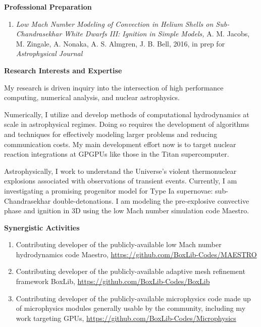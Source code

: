 \documentclass[11pt,letterpaper,english]{article}
\begin{document}
\begin{flushleft} {\bf Professional Preparation}
\begin{enumerate}
\item {\it Low Mach Number Modeling of Convection in Helium Shells on Sub-Chandrasekhar White
   Dwarfs III: Ignition in Simple Models,} A. M. Jacobs, M. Zingale, A. Nonaka, A. S. Almgren,
   J. B. Bell, 2016, in prep for {\it Astrophysical Journal}

\end{enumerate} 

\vspace{-6pt}
{\bf Research Interests and Expertise}
{\parindent 16pt

  My research is driven inquiry into the intersection of
  high performance computing, numerical analysis, and nuclear astrophysics.  
  
  Numerically, I utilize and develop methods of computational hydrodynamics
  at scale in astrophysical regimes.  Doing so requires the development of algorithms and techniques
  for effectively modeling larger problems and reducing communication costs.
  My main development effort now is to target nuclear reaction integrations at GPGPUs
  like those in the Titan supercomputer.
  
  Astrophysically, I work to understand the Universe's violent thermonuclear
  explosions associated with observations of transient events.  Currently,
  I am investigating a promising progenitor model for Type Ia supernovae:
  sub-Chandrasekhar double-detonations.  I am modeling the pre-explosive
  convective phase and ignition in 3D using the low Mach number simulation
  code Maestro.

}

\vspace{.04in}
{\bf Synergistic Activities}
\vspace{-6pt}
\begin{enumerate} \itemsep1pt \parskip0pt 
\item Contributing developer of the publicly-available low Mach number
  hydrodynamics code Maestro,
  \url{https://github.com/BoxLib-Codes/MAESTRO} \\

\item Contributing developer of the publicly-available adaptive mesh
  refinement framework BoxLib,
  \url{https://github.com/BoxLib-Codes/BoxLib} \\

\item Contributing developer of the publicly-available microphysics code made
  up of microphysics modules generally usable by the community, including my
  work targeting GPUs,
  \url{https://github.com/BoxLib-Codes/Microphysics} \\


\end{enumerate}
\end{flushleft}
\end{document}
